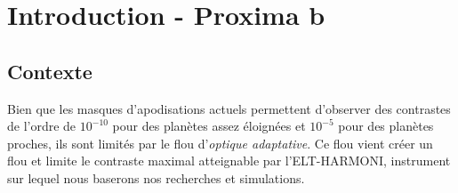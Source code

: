 \section{Introduction - Proxima b}

\subsection{Contexte}

Bien que les masques d'apodisations actuels permettent d'observer des contrastes de l'ordre de $10^{-10}$ pour des planètes assez éloignées et $10^{-5}$ pour des planètes proches, ils sont limités par le flou d'\textsl{optique adaptative}. Ce flou vient créer un flou et limite le contraste maximal atteignable par l'ELT-HARMONI, instrument sur lequel nous baserons nos recherches et simulations.







